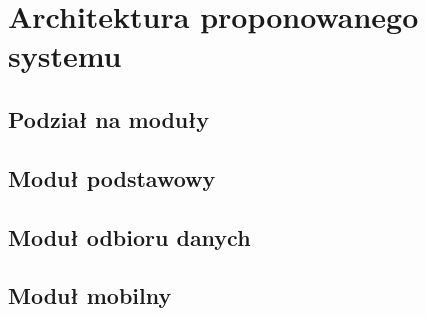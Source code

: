 \chapter{Architektura proponowanego systemu}

\section[Podział na moduły][Podział na moduły]{Podział na moduły}

\section[Moduł podstawowy][Moduł podstawowy]{Moduł podstawowy}

\section[Moduł odbioru danych][Moduł odbioru danych]{Moduł odbioru danych}

\section[Moduł mobilny][Moduł mobilny]{Moduł mobilny}
